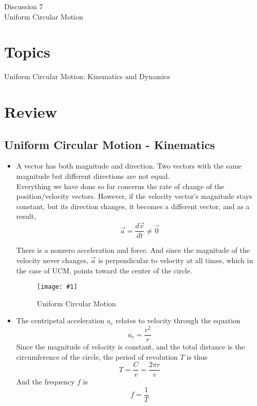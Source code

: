 \documentclass[11pt]{article}
\newcommand{\fig}[4]{
    \begin{figure}[H]
        \centering
        \texttt{[image: \#1]}
        \caption{#2}
        \label{exp4fit}
    \end{figure}
}
\theoremstyle{gangnamstyle}{\newtheorem{definition}{Definition}[]}
\theoremstyle{gangnamstyle}{\newtheorem{example}{Example}[]}
\theoremstyle{gangnamstyle}{\newtheorem{problem}{Problem}[]}
\begin{document}
\normalfont
\pagestyle{pages}


\begin{center}
\vspace{3in}
{\Large Discussion 7 } \\ [0.05in]
Uniform Circular Motion \\ [-0.5in]
\end{center}

\section*{Topics}
Uniform Circular Motion: Kinematics and Dynamics

\section{Review}

\subsection{Uniform Circular Motion - Kinematics}

\begin{itemize}
\item A vector has both magnitude and direction. Two vectors with the same magnitude but different directions are not equal. \\

Everything we have done so far concerns the rate of change of the position/velocity vectors. However, if the velocity vector's magnitude stays constant, but its direction changes, it becomes a different vector, and as a result, 
\[ \Vec{a} = \frac{d\Vec{v}}{dt} \neq \Vec{0} \]

There is a nonzero acceleration and force. And since the magnitude of the velocity never changes, $\Vec{a}$ is perpendicular to velocity at all times, which in the case of UCM, points toward the center of the circle. 

\fig{figs/0627/ucm.png}{Uniform Circular Motion}{0.65}{0}

\pagebreak

\item The centripetal acceleration $a_c$ relates to velocity through the equation
\[ a_c = \frac{v^2}{r} \]
Since the magnitude of velocity is constant, and the total distance is the circumference of the circle, the period of revolution $T$ is thus
\[ T = \frac{C}{v} = \frac{2\pi r}{v} \]
And the frequency $f$ is
\[ f = \frac{1}{T} \]
\end{itemize}
\end{document}

